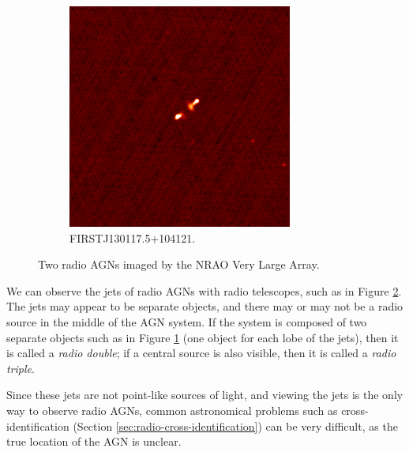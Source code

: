 \begin{figure}
\begin{subfigure}{0.4\textwidth}
                \includegraphics[width=\textwidth]
                    {images/FIRST_130117.5+104121.PNG}
                \caption{FIRSTJ130117.5+104121.}
                \label{fig:first-double}
            \end{subfigure}%
            \caption{Two radio AGNs imaged by the NRAO Very Large Array.}
            \label{fig:first-agn}
        \end{figure}

        We can observe the jets of radio AGNs with radio telescopes, such as in
        Figure \ref{fig:first-agn}. The jets may appear to be separate objects,
        and there may or may not be a radio source in the middle of the AGN
        system. If the system is composed of two separate objects such as in
        Figure \ref{fig:first-double} (one object for each lobe of the jets),
        then it is called a \emph{radio double}; if a central source is also
        visible, then it is called a \emph{radio triple}.

        Since these jets are not point-like sources
        of light, and viewing the jets is the only way to observe radio AGNs,
        common astronomical problems such as cross-identification (Section
        \ref{sec:radio-cross-identification}) can be very difficult, as the true
        location of the AGN is unclear.

